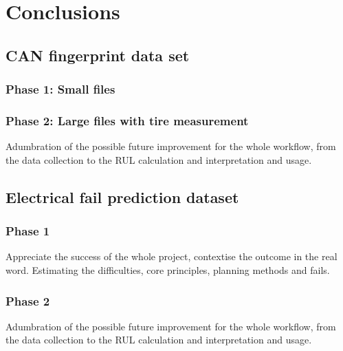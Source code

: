 \chapter{Conclusions}
\section{CAN fingerprint data set}
\subsection{Phase 1: Small files}





\subsection{Phase 2: Large files with tire measurement}
Adumbration of the possible future improvement for the whole workflow, from the data collection to the RUL calculation and interpretation and usage.
\section{Electrical fail prediction dataset}
\subsection{Phase 1}
Appreciate the success of the whole project, contextise the outcome in the real word. Estimating the difficulties, core principles, planning methods and fails.

\subsection{Phase 2}
Adumbration of the possible future improvement for the whole workflow, from the data collection to the RUL calculation and interpretation and usage.

